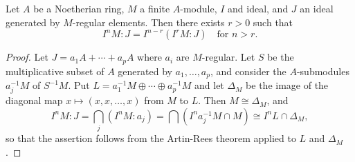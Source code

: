 \documentclass[../main]{subfiles}
\begin{document}
\begin{parproposition}\label{pro:11.01}
Let $A$ be a Noetherian ring, $M$ a finite $A$-module, $I$ and ideal, and $J$ an ideal generated by $M$-regular elements. Then there exists $r>0$ such that \[I^nM: J=I^{n-r}(I^r M: J) \quad\text{for } n>r.\]
\end{parproposition}

\begin{proof}
Let $J=a_1A+\cdots+a_pA$ where $a_i$ are $M$-regular. Let $S$ be the multiplicative subset of $A$ generated by $a_1,\ldots,a_p$, and consider the $A$-submodules $a_j^{-1}M$ of $S^{-1}M$. Put $L=a_1^{-1}M \oplus\cdots\oplus a_p^{-1}M$ and let $\Delta_M$ be the image of the diagonal map $x \mapsto (x, x, \ldots, x)$ from $M$ to $L$. Then $M\cong\Delta_M$, and \[I^n M: J=\bigcap_j(I^nM:a_j)=\bigcap(I^na_j^{-1} M \cap M) \cong I^nL\cap\Delta_M,\] so that the assertion follows from the Artin-Rees theorem applied to $L$ and $\Delta_M$.
\end{proof}
\end{document}
